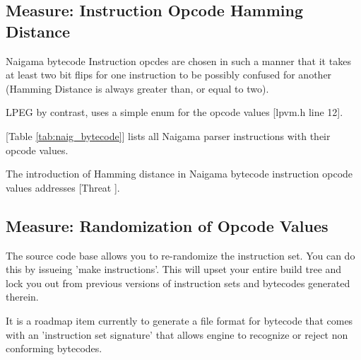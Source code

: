 \subsection{Measure: Instruction Opcode Hamming Distance}

Naigama bytecode Instruction opcdes are chosen in such a manner
that it takes at least two bit flips for one instruction to be
possibly confused for another (Hamming Distance is always greater than,
or equal to two).

LPEG \cite{bib:lpeg} by contrast, uses a simple enum for the
opcode values [lpvm.h line 12].

[Table \ref{tab:naig_bytecode}] lists all Naigama parser
instructions with their opcode values.

The introduction of Hamming distance in Naigama bytecode instruction
opcode values addresses [Threat \thethreatbcupset].



\subsection{Measure: Randomization of Opcode Values}

The source code base allows you to re-randomize the instruction set.
You can do this by issueing 'make instructions'. This will upset
your entire build tree and lock you out from previous versions
of instruction sets and bytecodes generated therein.

It is a roadmap item currently to generate a file format for bytecode
that comes with an 'instruction set signature' that allows engine
to recognize or reject non conforming bytecodes.
